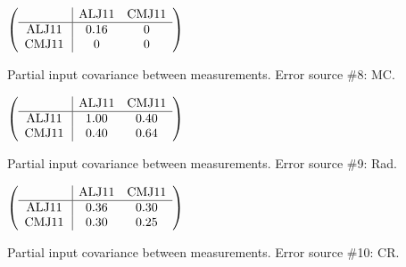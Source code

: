\begin{table}[H]
\scriptsize
\begin{center}
\renewcommand{\arraystretch}{1.1}
\begin{math}\left(\begin{array}{c|cc}
 & \mathrm{ALJ11} & 
\mathrm{CMJ11} \\
\hline
\mathrm{ALJ11} \hspace*{2pt} &       0.16 &  0 \\
\mathrm{CMJ11} \hspace*{2pt} &  0 &  0 \\
\end{array}\right)\end{math}
\caption{Partial input covariance between measurements. Error source \#8: MC.}
\renewcommand{\arraystretch}{1}
\end{center}
\end{table}
\begin{table}[H]
\scriptsize
\begin{center}
\renewcommand{\arraystretch}{1.1}
\begin{math}\left(\begin{array}{c|cc}
 & \mathrm{ALJ11} & 
\mathrm{CMJ11} \\
\hline
\mathrm{ALJ11} \hspace*{2pt} &       1.00 &       0.40 \\
\mathrm{CMJ11} \hspace*{2pt} &       0.40 &       0.64 \\
\end{array}\right)\end{math}
\caption{Partial input covariance between measurements. Error source \#9: Rad.}
\renewcommand{\arraystretch}{1}
\end{center}
\end{table}
\begin{table}[H]
\scriptsize
\begin{center}
\renewcommand{\arraystretch}{1.1}
\begin{math}\left(\begin{array}{c|cc}
 & \mathrm{ALJ11} & 
\mathrm{CMJ11} \\
\hline
\mathrm{ALJ11} \hspace*{2pt} &       0.36 &       0.30 \\
\mathrm{CMJ11} \hspace*{2pt} &       0.30 &       0.25 \\
\end{array}\right)\end{math}
\caption{Partial input covariance between measurements. Error source \#10: CR.}
\renewcommand{\arraystretch}{1}
\end{center}
\end{table}
